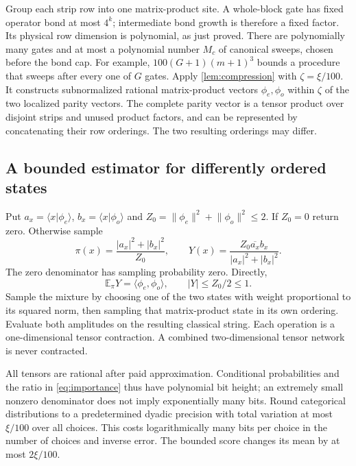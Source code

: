 \documentclass[11pt,reqno]{amsart}
\numberwithin{equation}{section}
\theoremstyle{definition}
\theoremstyle{remark}
\newcommand{\E}{\mathbb E}
\newcommand{\nn}[1]{\lVert#1\rVert}
\newcommand{\ip}[2]{\langle#1,#2\rangle}
\newcommand{\bra}[1]{\langle#1\rvert}
\begin{document}
Group each strip row into one matrix-product site. A whole-block gate has fixed operator bond at most $4^k$; intermediate bond growth is therefore a fixed factor. Its physical row dimension is polynomial, as just proved. There are polynomially many gates and at most a polynomial number $M_c$ of canonical sweeps, chosen before the bond cap. For example, $100(G+1)(m+1)^3$ bounds a procedure that sweeps after every one of $G$ gates. Apply \cref{lem:compression} with $\zeta=\xi/100$. It constructs subnormalized rational matrix-product vectors $\phi_e,\phi_o$ within $\zeta$ of the two localized parity vectors. The complete parity vector is a tensor product over disjoint strips and unused product factors, and can be represented by concatenating their row orderings. The two resulting orderings may differ.

\subsection{A bounded estimator for differently ordered states}
Put $a_x=\bra x\phi_e\rangle$, $b_x=\bra x\phi_o\rangle$ and $Z_0=\nn{\phi_e}^2+\nn{\phi_o}^2\leq2$. If $Z_0=0$ return zero. Otherwise sample
\begin{equation}\label{eq:importance}
 \pi(x)=\frac{|a_x|^2+|b_x|^2}{Z_0},\qquad
 Y(x)=\frac{Z_0\overline{a_x}b_x}{|a_x|^2+|b_x|^2}.
\end{equation}
The zero denominator has sampling probability zero. Directly,
\begin{equation}\label{eq:bounded}
 \E_\pi Y=\ip{\phi_e}{\phi_o},\qquad |Y|\leq Z_0/2\leq1.
\end{equation}
Sample the mixture by choosing one of the two states with weight proportional to its squared norm, then sampling that matrix-product state in its own ordering. Evaluate both amplitudes on the resulting classical string. Each operation is a one-dimensional tensor contraction. A combined two-dimensional tensor network is never contracted.

All tensors are rational after paid approximation. Conditional probabilities and the ratio in \eqref{eq:importance} thus have polynomial bit height; an extremely small nonzero denominator does not imply exponentially many bits. Round categorical distributions to a predetermined dyadic precision with total variation at most $\xi/100$ over all choices. This costs logarithmically many bits per choice in the number of choices and inverse error. The bounded score changes its mean by at most $2\xi/100$.
\end{document}
